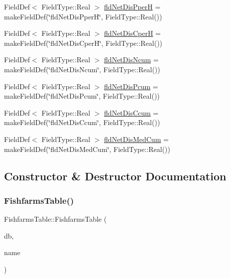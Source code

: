 \begin{DoxyCompactItemize}
Field\+Def$<$ Field\+Type\+::\+Real $>$ \mbox{\hyperlink{class_fishfarms_table_a4b6f22df6eafb3566834d5af83398330}{fld\+Net\+Dis\+PperH}} = make\+Field\+Def(\char`\"{}fld\+Net\+Dis\+PperH\char`\"{}, Field\+Type\+::\+Real())
\item 
Field\+Def$<$ Field\+Type\+::\+Real $>$ \mbox{\hyperlink{class_fishfarms_table_ac37af2dd869cf9440630ece77aa9b4ad}{fld\+Net\+Dis\+CperH}} = make\+Field\+Def(\char`\"{}fld\+Net\+Dis\+CperH\char`\"{}, Field\+Type\+::\+Real())
\item 
Field\+Def$<$ Field\+Type\+::\+Real $>$ \mbox{\hyperlink{class_fishfarms_table_a8c58079b7605719ac5a0877222681163}{fld\+Net\+Dis\+Ncum}} = make\+Field\+Def(\char`\"{}fld\+Net\+Dis\+Ncum\char`\"{}, Field\+Type\+::\+Real())
\item 
Field\+Def$<$ Field\+Type\+::\+Real $>$ \mbox{\hyperlink{class_fishfarms_table_aa5a26112e4b750c58e61821f6cac2653}{fld\+Net\+Dis\+Pcum}} = make\+Field\+Def(\char`\"{}fld\+Net\+Dis\+Pcum\char`\"{}, Field\+Type\+::\+Real())
\item 
Field\+Def$<$ Field\+Type\+::\+Real $>$ \mbox{\hyperlink{class_fishfarms_table_ae3d67ede322567aa13dc331b274e0a91}{fld\+Net\+Dis\+Ccum}} = make\+Field\+Def(\char`\"{}fld\+Net\+Dis\+Ccum\char`\"{}, Field\+Type\+::\+Real())
\item 
Field\+Def$<$ Field\+Type\+::\+Real $>$ \mbox{\hyperlink{class_fishfarms_table_aa6ee1fbbc9f0017dccf1ef8d4d58764f}{fld\+Net\+Dis\+Med\+Cum}} = make\+Field\+Def(\char`\"{}fld\+Net\+Dis\+Med\+Cum\char`\"{}, Field\+Type\+::\+Real())
\end{DoxyCompactItemize}


\subsection{Constructor \& Destructor Documentation}
\mbox{\label{class_fishfarms_table_ae2712d8cb76f1ddbbea5ec4bd5659a19}} 
\subsubsection{\texorpdfstring{FishfarmsTable()}{FishfarmsTable()}}
{\footnotesize\ttfamily Fishfarms\+Table\+::\+Fishfarms\+Table (\begin{DoxyParamCaption}\item[{std\+::shared\+\_\+ptr$<$ S\+Q\+Lite\+Storage $>$}]{db,  }\item[{std\+::string}]{name }\end{DoxyParamCaption})}

